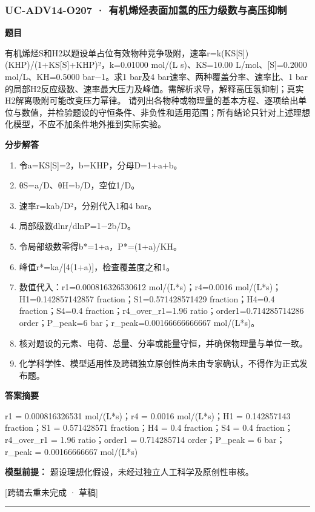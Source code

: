 \documentclass[UTF8,11pt,a4paper]{ctexart}
\begin{document}
\subsubsection*{UC-ADV14-O207 · 有机烯烃表面加氢的压力级数与高压抑制}
\noindent\textbf{题目}\par
有机烯烃S和H2以题设单占位有效物种竞争吸附，速率r=k(KS[S])(KHP)/(1+KS[S]+KHP)²，k=0.01000 mol/(L s)、KS=10.00 L/mol、[S]=0.2000 mol/L、KH=0.5000 bar−1。求1 bar及4 bar速率、两种覆盖分率、速率比、1 bar的局部H2反应级数、速率最大压力及峰值。需解析求导，解释高压氢抑制；真实H2解离吸附可能改变压力幂律。 请列出各物种或物理量的基本方程、逐项给出单位与数值，并检验题设的守恒条件、非负性和适用范围；所有结论只针对上述理想化模型，不应不加条件地外推到实际实验。\par
\medskip\noindent\textbf{分步解答}
\begin{enumerate}
\item 令a=KS[S]=2，b=KHP，分母D=1+a+b。
\item θS=a/D、θH=b/D，空位1/D。
\item 速率r=kab/D²，分别代入1和4 bar。
\item 局部级数dlnr/dlnP=1−2b/D。
\item 令局部级数零得b*=1+a，P*=(1+a)/KH。
\item 峰值r*=ka/[4(1+a)]，检查覆盖度之和1。
\item 数值代入：r1=0.000816326530612 mol/(L*s)；r4=0.0016 mol/(L*s)；H1=0.142857142857 fraction；S1=0.571428571429 fraction；H4=0.4 fraction；S4=0.4 fraction；r4\_over\_r1=1.96 ratio；order1=0.714285714286 order；P\_peak=6 bar；r\_peak=0.00166666666667 mol/(L*s)。
\item 核对题设的元素、电荷、总量、分率或能量守恒，并确保物理量与单位一致。
\item 化学科学性、模型适用性及跨辑独立原创性尚未由专家确认，不得作为正式发布题。
\end{enumerate}
\noindent\textbf{答案摘要}\par
r1 = 0.000816326531 mol/(L*s)；r4 = 0.0016 mol/(L*s)；H1 = 0.142857143 fraction；S1 = 0.571428571 fraction；H4 = 0.4 fraction；S4 = 0.4 fraction；r4\_over\_r1 = 1.96 ratio；order1 = 0.714285714 order；P\_peak = 6 bar；r\_peak = 0.00166666667 mol/(L*s)\par
\noindent\textbf{模型前提：}
题设理想化假设，未经过独立人工科学及原创性审核。\par
\noindent\textcolor{red!65!black}{[跨辑去重未完成 · 草稿]} \par
\medskip\hrule\medskip
{}
\end{document}
